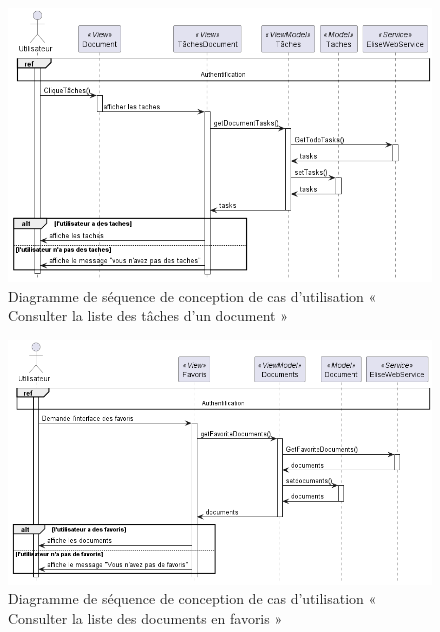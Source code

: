 \begin{figure}[H]
  \centering
  \includegraphics[width=1\textwidth]{out/diagrams/documents/sequence_preview_tasks/sequence_preview_tasks}
  \caption{Diagramme de séquence de conception de cas d'utilisation « Consulter la liste des tâches d'un document »}
  \label{fig:sequence_conception_previewTasks}
\end{figure}
\begin{figure}[H]
  \centering
  \includegraphics[width=1\textwidth]{out/diagrams/documents/sequence_favoris/sequence_favoris}
  \caption{Diagramme de séquence de conception de cas d'utilisation « Consulter la liste des documents en favoris »}
  \label{fig:sequence_conception_favoritDocument}
\end{figure}
